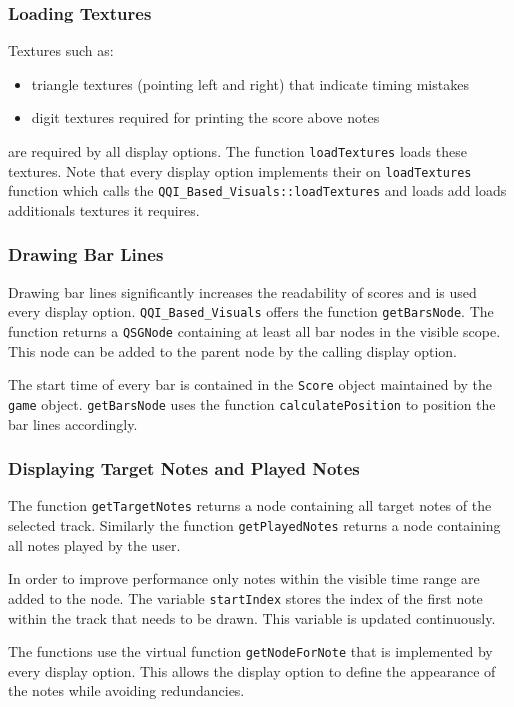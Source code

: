 \subsubsection{Loading Textures}
Textures such as:
\begin{itemize}
	\item{triangle textures (pointing left and right) that indicate timing mistakes}
	\item{digit textures required for printing the score above notes}
\end{itemize}
are required by all display options. The function {\tt loadTextures} loads these textures.
Note that every display option implements their on {\tt loadTextures} function which calls the {\tt QQI\_Based\_Visuals::loadTextures} and loads add loads additionals textures it requires.

\subsubsection{Drawing Bar Lines}
Drawing bar lines significantly increases the readability of scores and is used every display option.
{\tt QQI\_Based\_Visuals} offers the function {\tt getBarsNode}. The function returns a {\tt QSGNode} containing at least all bar nodes in the visible scope. This node can be added to the parent node by the calling display option.

The start time of every bar is contained in the {\tt Score} object maintained by the {\tt game} object. {\tt getBarsNode} uses the function {\tt calculatePosition} to position the bar lines accordingly.

\subsubsection{Displaying Target Notes and Played Notes}
The function {\tt getTargetNotes} returns a node containing all target notes of the selected track. 
Similarly the function {\tt getPlayedNotes} returns a node containing all notes played by the user.

In order to improve performance only notes within the visible time range are added to the node.
The variable {\tt startIndex} stores the index of the first note within the track that needs to be drawn. This variable is updated continuously.

The functions use the virtual function {\tt getNodeForNote} that is implemented by every display option. This allows the display option to define the appearance of the notes while avoiding redundancies.

